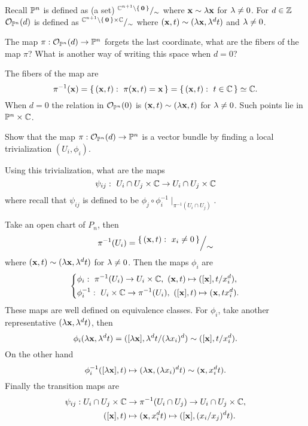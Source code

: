 \documentclass[12pt]{memoir}
\begin{document}
\begin{Ej}
    Recall $\mathbb{P}^n$ is defined as (a set) $\quot{\bC^{n+1}\less\set{\vec{0}}}{\sim}$ where $\mathbf{x}\sim\lambda\mathbf{x}$ for $\lambda\neq 0$. For $d\in\mathbb{Z}$ $\mathcal{O}_{\mathbb{P}^n}(d)$ is defined as $\quot{\bC^{n+1}\less\set{\vec{0}}\x\bC}{\sim}$ where $(\mathbf{x},t)\sim(\lambda\mathbf{x},\lambda^d t)$ and $\lambda\neq 0$.\par 
    The map $\pi:\mathcal{O}_{\mathbb{P}^n}(d)\to\mathbb{P}^n$ forgets the last coordinate, what are the fibers of the map $\pi$? What is another way of writing this space when $d=0$?
 \end{Ej}
 
 \begin{ptcbr}
    The fibers of the map are 
    $$\pi^{-1}(\vec{x})=\set{(\vec{x},t):\ \pi(\vec{x},t)=\vec{x}}=\set{(\vec{x},t):\ t\in\bC}\isom\bC.$$
    When $d=0$ the relation in $\mathcal{O}_{\mathbb{P}^n}(0)$ is $(\mathbf{x},t)\sim(\lambda\mathbf{x},t)$ for $\lambda\neq 0$. Such points lie in $\mathbb{P}^n\times\mathbb{C}$.
 \end{ptcbr}

 \begin{Ej}
    Show that the map $\pi:\mathcal{O}_{\mathbb{P}^n}(d)\to\mathbb{P}^n$ is a vector bundle by finding a local trivialization $(U_i,\phi_i)$.\par 
    Using this trivialization, what are the maps
$$\psi_{ij}:\ U_i \cap U_j \times \mathbb{C} \to U_i \cap U_j \times \mathbb{C}$$
where recall that $\psi_{ij}$ is defined to be $\phi_j\circ\phi_i^{-1}\mid_{\pi^{-1}(U_i\cap U_j)}$.
 \end{Ej}
 
 \begin{ptcbr}
    Take an open chart of $P_n$, then 
    $$\pi^{-1}(U_i)=\quot{\set{(\vec{x},t):\ x_i\neq 0}}{\sim}$$
    where $(\mathbf{x},t)\sim(\lambda \mathbf{x},\lambda^d t)$ for $\lambda\neq 0$. Then the maps $\phi_i$ are 
    $$
    \left\lbrace
    \begin{aligned}
        &\phi_i:\ \pi^{-1}(U_i)\to U_i\x\bC,\ (\vec{x},t)\mapsto ([\vec{x}],t/x_i^d),\\
        &\phi_i^{-1}:\  U_i\x\bC\to\pi^{-1}(U_i),\ ([\vec{x}],t)\mapsto (\vec{x},tx_i^d).
    \end{aligned}
    \right.
    $$
    These maps are well defined on equivalence classes. For $\phi_i$, take another representative $(\lambda\mathbf{x},\lambda^d t)$, then 
    $$\phi_i(\lambda\mathbf{x},\lambda^d t)=([\lambda\mathbf{x}],\lambda^d t/(\lambda x_i)^d)\sim([\mathbf{x}],t/x_i^d).$$
    On the other hand 
    $$\phi_i^{-1}([\lambda\mathbf{x}],t)\mapsto(\lambda\mathbf{x},(\lambda x_i)^dt)\sim(\mathbf{x},x_i^dt).$$
    Finally the transition maps are 
    \begin{align*}
        \psi_{ij}:U_i \cap U_j \times \mathbb{C}&\to\pi^{-1}(U_i\cap U_j)\to U_i \cap U_j \times \mathbb{C},\\
        ([\mathbf{x}],t)&\mapsto(\mathbf{x},x_i^dt)\mapsto([\mathbf{x}],(x_i/x_j)^dt).
    \end{align*}
 \end{ptcbr}
 
\end{document}
